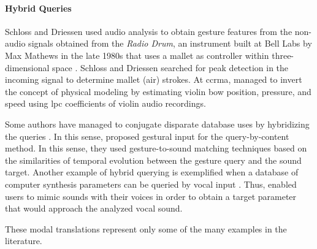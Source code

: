 {	\paragraph{Hybrid Queries}
	Schloss and Driessen \parencite{icmc/bbp2372.2001.103} used audio analysis to obtain gesture features from the non-audio signals obtained from the \textit{Radio Drum}, an instrument built at Bell Labs by Max Mathews in the late 1980s that uses a mallet as controller within three-dimensional space \parencite{DBLP:conf/icmc/Boie89}. Schloss and Driessen searched for peak detection in the incoming signal to determine mallet (air) strokes. At \gls{ccrma}, \citeauthor{icmc/bbp2372.2001.071} \parencite{icmc/bbp2372.2001.071} managed to invert the concept of physical modeling by estimating violin bow position, pressure, and speed using \gls{lpc} coefficients of violin audio recordings. 

	Some authors have managed to conjugate disparate database uses by hybridizing the queries \parencite{Caramiaux2011}. In this sense, \citeauthor{Caramiaux2011} proposed gestural input for the query-by-content method. In this sense, they used gesture-to-sound matching techniques based on the similarities of temporal evolution between the gesture query and the sound target. Another example of hybrid querying is exemplified when a database of computer synthesis parameters can be queried by vocal input \parencite{mcartwright:2014}. Thus, \citeauthor{mcartwright:2014} enabled users to mimic sounds with their voices in order to obtain a target parameter that would approach the analyzed vocal sound. 

	These modal translations represent only some of the many examples in the literature.
}

